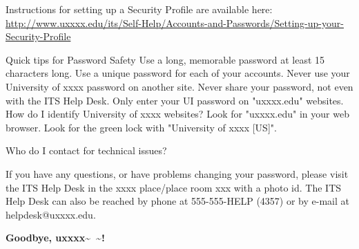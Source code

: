 \documentclass[9pt,b5paper]{article}
\begin{document}
Instructions for setting up a Security Profile are available here:
\url{http://www.uxxxx.edu/its/Self-Help/Accounts-and-Passwords/Setting-up-your-Security-Profile}

Quick tips for Password Safety
Use a long, memorable password at least 15 characters long.
Use a unique password for each of your accounts.
Never use your University of xxxx password on another site.
Never share your password, not even with the ITS Help Desk.
Only enter your UI password on "uxxxx.edu" websites.
How do I identify University of xxxx websites?
Look for "uxxxx.edu" in your web browser.
Look for the green lock with "University of xxxx [US]".

Who do I contact for technical issues?

If you have any questions, or have problems changing your password, please visit the ITS Help Desk in the xxxx place/place room xxx with a photo id. The ITS Help Desk can also be reached by phone at 555-555-HELP (4357) or by e-mail at helpdesk@uxxxx.edu.

\textbf{Goodbye, uxxxx\textasciitilde{}~\textasciitilde{}!}
\end{document}
